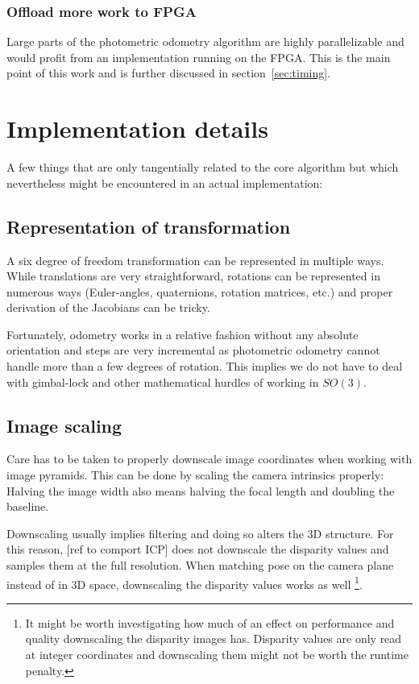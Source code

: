 \subsubsection{Offload more work to FPGA}

Large parts of the photometric odometry algorithm are highly parallelizable and
would profit from an implementation running on the FPGA. This is the main point
of this work and is further discussed in section~\ref{sec:timing}.



\section{Implementation details}

A few things that are only tangentially related to the core algorithm but which
nevertheless might be encountered in an actual implementation:

\subsection{Representation of transformation}

A six degree of freedom transformation can be represented in multiple ways.
While translations are very straightforward, rotations can be represented in
numerous ways (Euler-angles, quaternions, rotation matrices, etc.) and proper
derivation of the Jacobians can be tricky.

Fortunately, odometry works in a relative fashion without any absolute
orientation and steps are very incremental as photometric odometry cannot
handle more than a few degrees of rotation. This implies we do not have to deal
with gimbal-lock and other mathematical hurdles of working in $SO(3)$.

\subsection{Image scaling}

Care has to be taken to properly downscale image coordinates when working with
image pyramids. This can be done by scaling the camera intrinsics properly:
Halving the image width also means halving the focal length and doubling the
baseline.

Downscaling usually implies filtering and doing so alters the 3D structure. For
this reason, [ref to comport ICP] does not downscale the disparity values and
samples them at the full resolution. When matching pose on the camera plane
instead of in 3D space, downscaling the disparity values works as well
\footnote{It might be worth investigating how much of an effect on performance
and quality downscaling the disparity images has. Disparity values are only
read at integer coordinates and downscaling them might not be worth the runtime
penalty.}.

